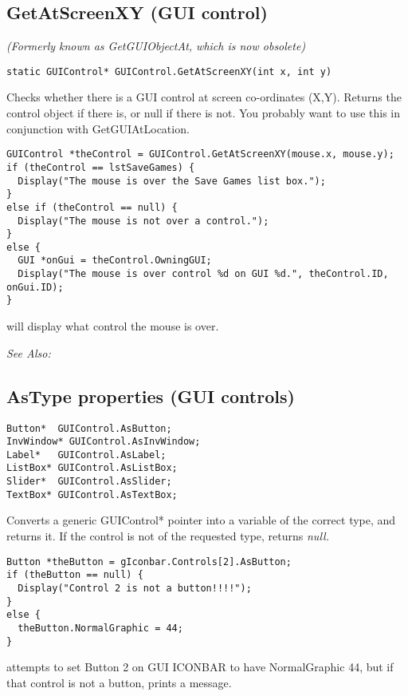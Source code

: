 \subsection{GetAtScreenXY (GUI control)}\label{GUIControl.GetAtScreenXY}%

\it{(Formerly known as GetGUIObjectAt, which is now obsolete)}

\begin{verbatim}
static GUIControl* GUIControl.GetAtScreenXY(int x, int y)
\end{verbatim}
Checks whether there is a GUI control at screen co-ordinates (X,Y). Returns
the control object if there is, or null if there is not. You probably
want to use this in conjunction with GetGUIAtLocation.

\begin{verbatim}
GUIControl *theControl = GUIControl.GetAtScreenXY(mouse.x, mouse.y);
if (theControl == lstSaveGames) {
  Display("The mouse is over the Save Games list box.");
}
else if (theControl == null) {
  Display("The mouse is not over a control.");
}
else {
  GUI *onGui = theControl.OwningGUI;
  Display("The mouse is over control %d on GUI %d.", theControl.ID, onGui.ID);
}
\end{verbatim}
will display what control the mouse is over.

\it{See Also:} 


\subsection{AsType properties (GUI controls)}\label{GUIControl.AsType}%

\begin{verbatim}
Button*  GUIControl.AsButton;
InvWindow* GUIControl.AsInvWindow;
Label*   GUIControl.AsLabel;
ListBox* GUIControl.AsListBox;
Slider*  GUIControl.AsSlider;
TextBox* GUIControl.AsTextBox;
\end{verbatim}
Converts a generic GUIControl* pointer into a variable of the correct type, and returns
it. If the control is not of the requested type, returns \it{null}.

\begin{verbatim}
Button *theButton = gIconbar.Controls[2].AsButton;
if (theButton == null) {
  Display("Control 2 is not a button!!!!");
}
else {
  theButton.NormalGraphic = 44;
}
\end{verbatim}
attempts to set Button 2 on GUI ICONBAR to have NormalGraphic 44, but if that
control is not a button, prints a message.

